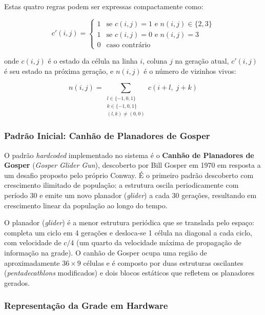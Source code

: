 \documentclass[12pt, a4paper]{article}
\begin{document}
	Estas quatro regras podem ser expressas compactamente como:
	
	\begin{equation}
		c'(i,j) =
		\begin{cases}
			1 & \text{se } c(i,j) = 1 \text{ e } n(i,j) \in \{2, 3\} \\
			1 & \text{se } c(i,j) = 0 \text{ e } n(i,j) = 3 \\
			0 & \text{caso contrário}
		\end{cases}
		\label{eq:regras}
	\end{equation}
	
	\noindent onde $c(i,j)$ é o estado da célula na linha $i$, coluna $j$ na
	geração atual, $c'(i,j)$ é seu estado na próxima geração, e $n(i,j)$ é o
	número de vizinhos vivos:
	
	\begin{equation}
		n(i,j) = \sum_{\substack{l \in \{-1,0,1\} \\ k \in \{-1,0,1\} \\ (l,k) \neq (0,0)}} c(i+l,\; j+k)
		\label{eq:vizinhos}
	\end{equation}
	
	\subsubsection{Padrão Inicial: Canhão de Planadores de Gosper}
	
	O padrão \textit{hardcoded} implementado no sistema é o \textbf{Canhão de
		Planadores de Gosper} (\textit{Gosper Glider Gun}), descoberto por Bill Gosper
	em 1970 em resposta a um desafio proposto pelo próprio Conway. É o primeiro
	padrão descoberto com crescimento ilimitado de população: a estrutura oscila
	periodicamente com período 30 e emite um novo planador (\textit{glider}) a cada
	30 gerações, resultando em crescimento linear da população ao longo do tempo.
	
	O planador (\textit{glider}) é a menor estrutura periódica que se translada
	pelo espaço: completa um ciclo em 4 gerações e desloca-se 1 célula na diagonal
	a cada ciclo, com velocidade de $c/4$ (um quarto da velocidade máxima de
	propagação de informação na grade). O canhão de Gosper ocupa uma região de
	aproximadamente $36 \times 9$ células e é composto por duas estruturas oscilantes
	(\textit{pentadecathlons} modificados) e dois blocos estáticos que refletem os
	planadores gerados.
	
	\subsubsection{Representação da Grade em Hardware}
	
\end{document}
